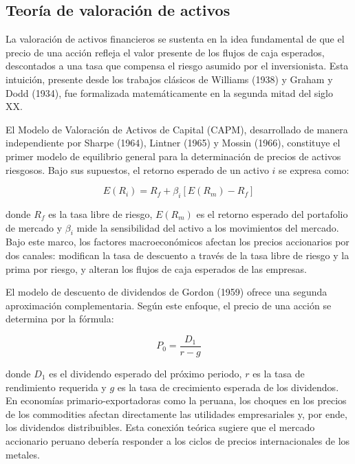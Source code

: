 \documentclass[12pt, a4paper]{article}
\begin{document}
\subsection{Teoría de valoración de activos}

La valoración de activos financieros se sustenta en la idea fundamental de que el precio de una acción refleja el valor presente de los flujos de caja esperados, descontados a una tasa que compensa el riesgo asumido por el inversionista. Esta intuición, presente desde los trabajos clásicos de Williams (1938) y Graham y Dodd (1934), fue formalizada matemáticamente en la segunda mitad del siglo XX.

El Modelo de Valoración de Activos de Capital (CAPM), desarrollado de manera independiente por Sharpe (1964), Lintner (1965) y Mossin (1966), constituye el primer modelo de equilibrio general para la determinación de precios de activos riesgosos. Bajo sus supuestos, el retorno esperado de un activo $i$ se expresa como:

\begin{equation}
E(R_i) = R_f + \beta_i \left[ E(R_m) - R_f \right]
\end{equation}

donde $R_f$ es la tasa libre de riesgo, $E(R_m)$ es el retorno esperado del portafolio de mercado y $\beta_i$ mide la sensibilidad del activo a los movimientos del mercado. Bajo este marco, los factores macroeconómicos afectan los precios accionarios por dos canales: modifican la tasa de descuento a través de la tasa libre de riesgo y la prima por riesgo, y alteran los flujos de caja esperados de las empresas.

El modelo de descuento de dividendos de Gordon (1959) ofrece una segunda aproximación complementaria. Según este enfoque, el precio de una acción se determina por la fórmula:

\begin{equation}
P_0 = \frac{D_1}{r - g}
\end{equation}

donde $D_1$ es el dividendo esperado del próximo periodo, $r$ es la tasa de rendimiento requerida y $g$ es la tasa de crecimiento esperada de los dividendos. En economías primario-exportadoras como la peruana, los choques en los precios de los commodities afectan directamente las utilidades empresariales y, por ende, los dividendos distribuibles. Esta conexión teórica sugiere que el mercado accionario peruano debería responder a los ciclos de precios internacionales de los metales.
\end{document}
